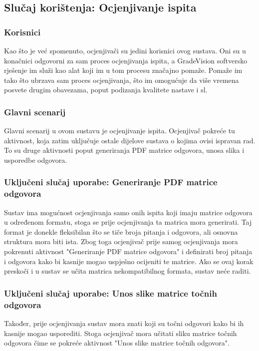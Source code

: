 \documentclass{foi}
\begin{document}
\subsection{Slučaj korištenja: Ocjenjivanje ispita}

\subsubsection{Korisnici}
Kao što je već spomenuto, ocjenjivači su jedini korisnici ovog sustava. Oni su u konačnici odgovorni za sam proces ocjenjivanja ispita, a GradeVision softversko rješenje im služi kao alat koji im u tom procesu značajno pomaže. Pomaže im tako što ubrzava sam proces ocjenjivanja, što im omogućuje da više vremena posvete drugim obavezama, poput podizanja kvalitete nastave i sl.

\subsubsection{Glavni scenarij}
Glavni scenarij u ovom sustavu je ocjenjivanje ispita. Ocjenjivač pokreće tu aktivnost, koja zatim uključuje ostale dijelove sustava o kojima ovisi ispravan rad. To su druge aktivnosti poput generiranja PDF matrice odgovora, unosa slika i usporedbe odgovora.

\subsubsection{Uključeni slučaj uporabe: Generiranje PDF matrice odgovora}
Sustav ima mogućnost ocjenjivanja samo onih ispita koji imaju matrice odgovora u određenom formatu, stoga se prije ocjenjivanja ta matrica mora generirati. Taj format je donekle fleksibilan što se tiče broja pitanja i odgovora, ali osnovna struktura mora biti ista. Zbog toga ocjenjivač prije samog ocjenjivanja mora pokrenuti aktivnost "Generiranje PDF matrice odgovora" i definirati broj pitanja i odgovora kako bi kasnije mogao uspješno ocijeniti te matrice. Ako se ovaj korak preskoči i u sustav se učita matrica nekompatibilnog formata, sustav neće raditi.

\subsubsection{Uključeni slučaj uporabe: Unos slike matrice točnih odgovora}
Također, prije ocjenjivanja sustav mora znati koji su točni odgovori kako bi ih kasnije mogao usporediti. Stoga ocjenjivač mora učitati sliku matrice točnih odgovora čime se pokreće aktivnost "Unos slike matrice točnih odgovora".
\end{document}
